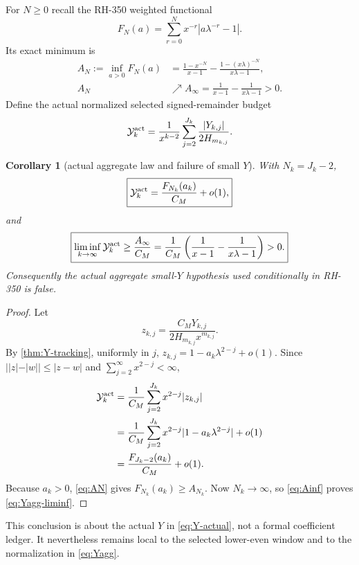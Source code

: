 \documentclass[11pt]{article}
\newtheorem{corollary}[theorem]{Corollary}
\theoremstyle{remark}
\newcommand{\cY}{\mathcal Y}
\begin{document}
For $N\ge0$ recall the RH-350 weighted functional
\begin{equation}\label{eq:F}
 F_N(a)=\sum_{r=0}^{N}x^{-r}|a\lambda^{-r}-1|.
\end{equation}
Its exact minimum is
\begin{align}
 A_N:=\inf_{a>0}F_N(a)
 &=\frac{1-x^{-N}}{x-1}
 -\frac{1-(x\lambda)^{-N}}{x\lambda-1},\label{eq:AN}\\
 A_N&\nearrow A_\infty
 =\frac1{x-1}-\frac1{x\lambda-1}>0.
 \label{eq:Ainf}
\end{align}
Define the actual normalized selected signed-remainder budget
\begin{equation}\label{eq:Yagg}
 \cY_k^{\rm act}
 =\frac1{x^{k-2}}
 \sum_{j=2}^{J_k}\frac{|Y_{k,j}|}{2H_{m_{k,j}}}.
\end{equation}

\begin{corollary}[actual aggregate law and failure of small $Y$]
\label{cor:Yagg}
With $N_k=J_k-2$,
\begin{equation}\label{eq:Yagg-law}
 \boxed{
 \cY_k^{\rm act}
 =\frac{F_{N_k}(a_k)}{C_M}+o(1),}
\end{equation}
and
\begin{equation}\label{eq:Yagg-liminf}
 \boxed{
 \liminf_{k\to\infty}\cY_k^{\rm act}
 \ge\frac{A_\infty}{C_M}
 =\frac1{C_M}
 \left(\frac1{x-1}-\frac1{x\lambda-1}\right)>0.}
\end{equation}
Consequently the actual aggregate small-$Y$ hypothesis used conditionally in
RH-350 is false.
\end{corollary}

\begin{proof}
Let
\[
 z_{k,j}=\frac{C_MY_{k,j}}
 {2H_{m_{k,j}}x^{m_{k,j}}}.
\]
By \cref{thm:Y-tracking}, uniformly in $j$,
$z_{k,j}=1-a_k\lambda^{2-j}+o(1)$.  Since
$||z|-|w||\le|z-w|$ and
$\sum_{j=2}^{\infty}x^{2-j}<\infty$,
\begin{align*}
 \cY_k^{\rm act}
 &=\frac1{C_M}
 \sum_{j=2}^{J_k}x^{2-j}|z_{k,j}|\\
 &=\frac1{C_M}
 \sum_{j=2}^{J_k}x^{2-j}
 |1-a_k\lambda^{2-j}|+o(1)\\
 &=\frac{F_{J_k-2}(a_k)}{C_M}+o(1).
\end{align*}
Because $a_k>0$, \eqref{eq:AN} gives
$F_{N_k}(a_k)\ge A_{N_k}$.  Now $N_k\to\infty$, so
\eqref{eq:Ainf} proves \eqref{eq:Yagg-liminf}.
\end{proof}

This conclusion is about the actual $Y$ in \eqref{eq:Y-actual}, not a
formal coefficient ledger.  It nevertheless remains local to the selected
lower-even window and to the normalization in \eqref{eq:Yagg}.
\end{document}
